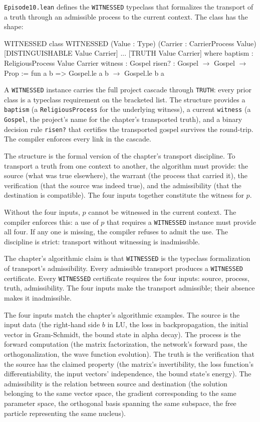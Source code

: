 \texttt{Episode10.lean} defines the \texttt{WITNESSED} typeclass that
formalizes the transport of a truth through an admissible process to
the current context. The class has the shape:

\begin{leanexcerpt}{WITNESSED}
class WITNESSED
    (Value : Type)
    (Carrier : CarrierProcess Value)
    [DISTINGUISHABLE Value Carrier] ... [TRUTH Value Carrier]
  where
  baptism : ReligiousProcess Value Carrier
  witness : Gospel
  risen?  : Gospel $\to$ Gospel $\to$ Prop := fun a b =>
    Gospel.le a b $\to$ Gospel.le b a
\end{leanexcerpt}

A \texttt{WITNESSED} instance carries the full project cascade
through \texttt{TRUTH}: every prior class is a typeclass
requirement on the bracketed list. The structure provides a
\texttt{baptism} (a \texttt{ReligiousProcess} for the underlying
witness), a current \texttt{witness} (a \texttt{Gospel}, the
project's name for the chapter's transported truth), and a
binary decision rule \texttt{risen?} that certifies the
transported gospel survives the round-trip. The compiler enforces
every link in the cascade.

The structure is the formal version of the chapter's transport
discipline. To transport a truth from one context to another, the
algorithm must provide: the source (what was true elsewhere), the
warrant (the process that carried it), the verification (that the
source was indeed true), and the admissibility (that the
destination is compatible). The four inputs together constitute the
witness for $p$.

Without the four inputs, $p$ cannot be witnessed in the current
context. The compiler enforces this: a use of $p$ that requires a
\texttt{WITNESSED} instance must provide all four. If any one is
missing, the compiler refuses to admit the use. The discipline is
strict: transport without witnessing is inadmissible.

The chapter's algorithmic claim is that \texttt{WITNESSED} is the
typeclass formalization of transport's admissibility. Every
admissible transport produces a \texttt{WITNESSED} certificate.
Every \texttt{WITNESSED} certificate requires the four inputs:
source, process, truth, admissibility. The four inputs make the
transport admissible; their absence makes it inadmissible.

The four inputs match the chapter's algorithmic examples. The
source is the input data (the right-hand side $b$ in LU, the
loss in backpropagation, the initial vector in Gram-Schmidt, the
bound state in alpha decay). The process is the forward
computation (the matrix factorization, the network's forward
pass, the orthogonalization, the wave function evolution). The
truth is the verification that the source has the claimed
property (the matrix's invertibility, the loss function's
differentiability, the input vectors' independence, the bound
state's energy). The admissibility is the relation between
source and destination (the solution belonging to the same vector
space, the gradient corresponding to the same parameter space,
the orthogonal basis spanning the same subspace, the free
particle representing the same nucleus).

